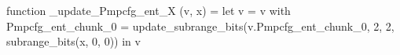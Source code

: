 function _update_Pmpcfg_ent_X (v, x) = let v = { v with Pmpcfg_ent_chunk_0 = update_subrange_bits(v.Pmpcfg_ent_chunk_0, 2, 2, subrange_bits(x, 0, 0)) } in
  v
